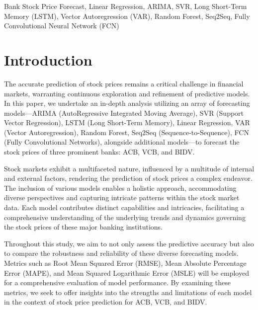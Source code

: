 \documentclass{ieeeojies}
\begin{document}
\begin{keywords}
Bank Stock Price Forecast, Linear Regression, ARIMA, SVR, Long Short-Term Memory (LSTM), Vector Autoregression (VAR), Random Forest, Seq2Seq, Fully Convolutional Neural Network (FCN)
\end{keywords}

\titlepgskip=-15pt

\maketitle

\section{Introduction}
\label{sec:introduction}
\hspace{1em}The accurate prediction of stock prices remains a critical challenge in financial markets, warranting continuous exploration and refinement of predictive models. In this paper, we undertake an in-depth analysis utilizing an array of forecasting models—ARIMA (AutoRegressive Integrated Moving Average), SVR (Support Vector Regression), LSTM (Long Short-Term Memory), Linear Regression, VAR (Vector Autoregression), Random Forest, Seq2Seq (Sequence-to-Sequence), FCN (Fully Convolutional Networks), alongside additional models—to forecast the stock prices of three prominent banks: ACB, VCB, and BIDV.

Stock markets exhibit a multifaceted nature, influenced by a multitude of internal and external factors, rendering the prediction of stock prices a complex endeavor. The inclusion of various models enables a holistic approach, accommodating diverse perspectives and capturing intricate patterns within the stock market data. Each model contributes distinct capabilities and intricacies, facilitating a comprehensive understanding of the underlying trends and dynamics governing the stock prices of these major banking institutions.

Throughout this study, we aim to not only assess the predictive accuracy but also to compare the robustness and reliability of these diverse forecasting models. Metrics such as Root Mean Squared Error (RMSE), Mean Absolute Percentage Error (MAPE), and Mean Squared Logarithmic Error (MSLE) will be employed for a comprehensive evaluation of model performance. By examining these metrics, we seek to offer insights into the strengths and limitations of each model in the context of stock price prediction for ACB, VCB, and BIDV.
\end{document}
